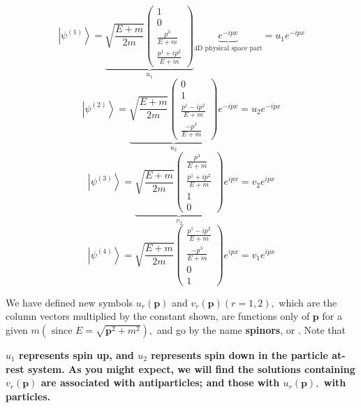 \begin{qt}
$$
\left|\psi^{(1)}\right\rangle=\underbrace{\sqrt{\frac{E+m}{2 m}}\left(\begin{array}{c}
{1} \\
{0} \\
{\frac{p^{3}}{E+m}} \\
{\frac{p^{1}+i p^{2}}{E+m}}
\end{array}\right) }_{u_1} \underbrace{e^{-i p x}}_{\text {4D physical space part}}=u_1e^{-i p x}
$$
$$
\left|\psi^{(2)}\right\rangle=\underbrace{\sqrt{\frac{E+m}{2 m}}\left(\begin{array}{c}
{0} \\
{1} \\
{\frac{p^{1}-i p^{2}}{E+m}} \\
{\frac{-p^{3}}{E+m}}
\end{array}\right)}_{u_2} e^{-i p x}=u_2e^{-i p x}
$$
$$
\left|\psi^{(3)}\right\rangle=\underbrace{\sqrt{\frac{E+m}{2 m}}\left(\begin{array}{c}
{\frac{p^{3}}{E+m}} \\
{\frac{p^{1}+i p^{2}}{E+m}}\\
{1} \\
{0} 
\end{array}\right)}_{v_2} e^{i p x}=v_2e^{i p x}
$$
\begin{equation}
\left|\psi^{(4)}\right\rangle=\sqrt{\frac{E+m}{2 m}}\left(\begin{array}{c}
{\frac{p^{1}-i p^{2}}{E+m}}\\
{\frac{-p^{3}}{E+m}} \\
{0} \\
{1} 
\end{array}\right) e^{i p x}=v_1e^{i p x}
\label{four-spinors}
\end{equation}
\end{qt}
We have defined new symbols $u_{r}(\mathbf{p})$ and $v_{r}(\mathbf{p})(r=1,2),$ which are the column vectors multiplied by the constant shown, are functions only of $\mathbf{p}$ for a given $m(\text { since } E=\sqrt{\mathbf{p}^{2}+m^{2}}),$ and go by the name \textbf{spinors}, or \textbf{}. Note that 

\textbf{$u_{1}$ represents spin up, and $u_{2}$ represents spin down in the particle at-rest system. As you might expect, we will find the solutions containing $v_{r}(\mathbf{p})$ are associated with antiparticles; and those with $u_{r}(\mathbf{p}),$ with particles.}

